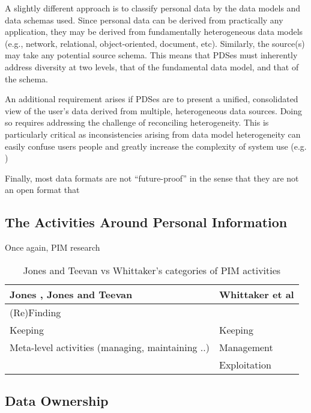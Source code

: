 \documentclass[runningheads,a4paper]{llncs}
\begin{document}
A slightly different approach is to classify personal data by the data models and data schemas used.  Since personal data can be derived from practically any application, they may be derived from fundamentally heterogeneous data models (e.g., network, relational, object-oriented, document, etc). Similarly, the source(s) may take any potential source schema.  This means that PDSes must inherently address diversity at two levels, that of the fundamental data model, and that of the schema.

An additional requirement arises if PDSes are to present a unified, consolidated view of the user's data derived from multiple, heterogeneous data sources. Doing so requires addressing the challenge of reconciling heterogeneity.  This is particularly critical as inconsistencies arising from data model heterogeneity can easily confuse users people and greatly increase the complexity of system use (e.g. \cite{})

Finally, most data formats are not ``future-proof'' in the sense that they are not an open format that 




\subsection{The Activities Around Personal Information}

Once again, PIM research 

\begin{table}
\begin{tabular}{p{5cm} p{7cm}} 
Jones \cite{jones}, Jones and Teevan \cite{jonesteevan}& Whittaker et al \cite{whittaker}\\
\hline
(Re)Finding &  \\
Keeping & Keeping \\
Meta-level activities (managing, maintaining ..) & Management \\
 & Exploitation \\
\end{tabular}
\caption{Jones and Teevan vs Whittaker's categories of PIM activities}
\label{fig:pimactivities}
\end{table}

\subsection{Data Ownership}



\end{document}

